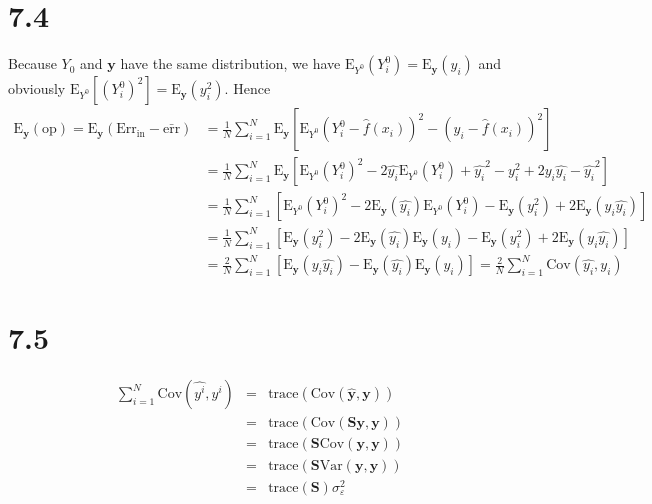 \documentclass[11pt, oneside]{article}   	%
\begin{document}
\section{7.4}
Because $Y_0$ and $\mathbf{y}$ have the same distribution, we have $\mathrm{E}_{Y^0}(Y_i^0)=\mathrm{E}_\mathbf{y}(y_i)$ and obviously $\mathrm{E}_{Y^0}[(Y_i^0)^2]=\mathrm{E}_\mathbf{y}(y_i^2)$. Hence
\begin{equation}
\begin{split}
\mathrm{E}_\mathbf{y}(\text{op})=\mathrm{E}_\mathbf{y}(\mathrm{Err}_\mathrm{in}-\bar{\mathrm{err}}) &= \frac{1}{N}\sum_{i=1}^N\mathrm{E}_\mathbf{y}[\mathrm{E}_{Y^0}(Y_i^0-\hat{f}(x_i))^2-(y_i-\hat{f}(x_i))^2] \\
&= \frac{1}{N}\sum_{i=1}^N\mathrm{E}_\mathbf{y}[\mathrm{E}_{Y^0}(Y_i^0)^2-2\hat{y_i}\mathrm{E}_{Y^0}(Y_i^0)+\hat{y_i}^2-y_i^2+2y_i\hat{y_i}-\hat{y_i}^2] \\
&= \frac{1}{N}\sum_{i=1}^N[\mathrm{E}_{Y^0}(Y_i^0)^2-2\mathrm{E}_\mathbf{y}(\hat{y_i})\mathrm{E}_{Y^0}(Y_i^0)-\mathrm{E}_\mathbf{y}(y_i^2)+2\mathrm{E}_\mathbf{y}(y_i\hat{y_i})] \\
&= \frac{1}{N}\sum_{i=1}^N[\mathrm{E}_\mathbf{y}(y_i^2)-2\mathrm{E}_\mathbf{y}(\hat{y_i})\mathrm{E}_\mathbf{y}(y_i)-\mathrm{E}_\mathbf{y}(y_i^2)+2\mathrm{E}_\mathbf{y}(y_i\hat{y_i})] \\
&= \frac{2}{N}\sum_{i=1}^N[\mathrm{E}_\mathbf{y}(y_i\hat{y_i})-\mathrm{E}_\mathbf{y}(\hat{y_i})\mathrm{E}_\mathbf{y}(y_i)] = \frac{2}{N}\sum_{i=1}^N\mathrm{Cov}(\hat{y_i},y_i)
\end{split}
\end{equation}

\section{7.5}
\begin{eqnarray}
\sum_{i=1}^N \mathrm{Cov}(\hat{y^i}, y^i) &=& \mathrm{trace} (\mathrm{Cov} (\hat{\mathbf{y}}, \mathbf{y})) \nonumber \\
&=& \mathrm{trace} (\mathrm{Cov} ( \mathbf{S}\mathbf{y}, \mathbf{y})) \nonumber \\
&=& \mathrm{trace} ( \mathbf{S}  \mathrm{Cov} (\mathbf{y}, \mathbf{y})) \nonumber \\
&=& \mathrm{trace} ( \mathbf{S}  \mathrm{Var} (\mathbf{y}, \mathbf{y})) \nonumber \\
&=& \mathrm{trace} (\mathbf{S}) \sigma_\varepsilon^2 \nonumber
\end{eqnarray}
\end{document}
